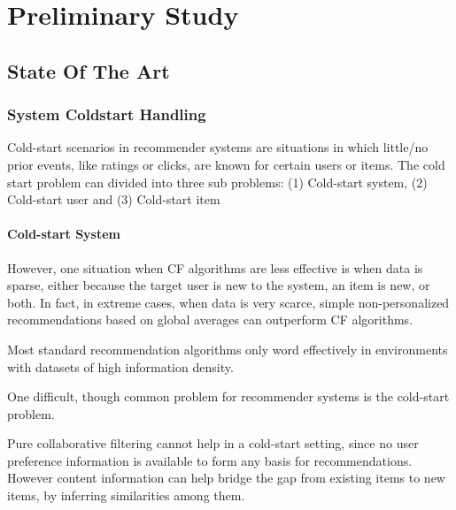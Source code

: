 
\chapter{Preliminary Study}
\minitoc

\clearpage

\section{State Of The Art}
\subsection{System Coldstart Handling}

Cold-start scenarios in recommender systems are situations in which little/no prior events, like ratings or clicks, are known for certain users or items. The cold start problem can divided into three sub problems: (1) Cold-start system, (2) Cold-start user and (3) Cold-start item

\subsubsection{Cold-start System}


However, one situation when CF algorithms are less effective is when data is sparse, either because the target user is new to the system, an item is new, or both. In fact, in extreme cases, when data is very scarce, simple non-personalized recommendations based on global averages can outperform CF algorithms.

Most standard recommendation algorithms only word effectively in environments with datasets of high information density.

One difficult, though common problem for recommender systems is the cold-start problem.

Pure collaborative filtering cannot help in a cold-start setting, since no user preference information is available to form any basis for recommendations. However content information can help bridge the gap from existing items to new items, by inferring similarities among them.


